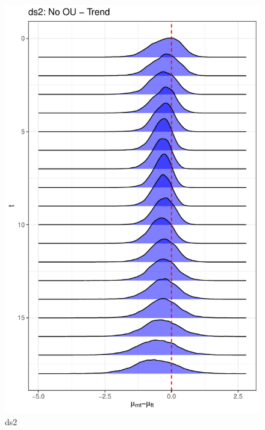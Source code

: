 \documentclass[
  12pt,
]{article}
\begin{document}
\begin{figure}

{\centering \includegraphics[width=0.9\linewidth]{../Figures/ds2/mu_diff} 

}

\caption{ds2}\label{fig:unnamed-chunk-9}
\end{figure}
\end{document}
